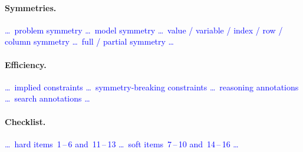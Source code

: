 \documentclass[a4paper,11pt,hidelinks]{article}
\renewcommand{\todo}[1]{\textcolor{blue}{#1}} %
\begin{document}
\paragraph{Symmetries.}
\todo{\dots\ problem symmetry \dots\ model symmetry \dots\ value /
  variable / index / row / column symmetry \dots\ full / partial
  symmetry \dots}

\paragraph{Efficiency.}
\todo{\dots\ implied constraints \dots\ symmetry-breaking constraints
  \dots\ reasoning annotations \dots\ search annotations \dots}

\paragraph{Checklist.}
\todo{\dots\ hard items~1\,--\,6 and~11\,--\,13 \dots\ soft
  items~7\,--\,10 and~14\,--\,16 \dots}
\end{document}
